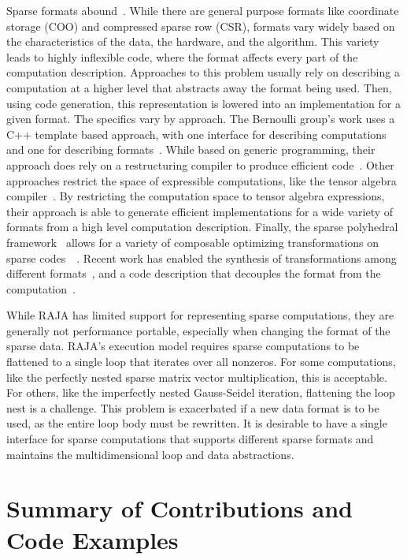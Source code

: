 Sparse formats abound~\cite{langr2015evaluation}. 
While there are general purpose formats like coordinate storage (COO) and compressed sparse row (CSR), formats vary widely based on the characteristics of the data, the hardware, and the algorithm.
This variety leads to highly inflexible code, where the format affects every part of the computation description.
Approaches to this problem usually rely on describing a computation at a higher level that abstracts away the format being used.
Then, using code generation, this representation is lowered into an implementation for a given format.
The specifics vary by approach.
The Bernoulli group's work uses a C++ template based approach, with one interface for describing computations~\cite{kotlyar1997relational} and one for describing formats~\cite{kotlyar1997compiling}.
While based on generic programming, their approach does rely on a restructuring compiler to produce efficient code~\cite{mateev2000bernoulli,ahmed2000framework}.
Other approaches restrict the space of expressible computations, like the tensor algebra compiler~\cite{kjolstad2017tensor}.
By restricting the computation space to tensor algebra expressions, their approach is able to generate efficient implementations for a wide variety of formats from a high level computation description.
Finally, the sparse polyhedral framework~\cite{strout2016approach} allows for a variety of composable optimizing transformations on sparse codes~~\cite{ahmad2017optimizing}.
Recent work has enabled the synthesis of transformations among different formats~\cite{popoola2023code}, and a code description that decouples the format from the computation~\cite{zhao2022polyhedral}.

While RAJA has limited support for representing sparse computations, they are generally not performance portable, especially when changing the format of the sparse data.
RAJA's execution model requires sparse computations to be flattened to a single loop that iterates over all nonzeros. 
For some computations, like the perfectly nested sparse matrix vector multiplication, this is acceptable.
For others, like the imperfectly nested Gauss-Seidel iteration, flattening the loop nest is a challenge.
This problem is exacerbated if a new data format is to be used, as the entire loop body must be rewritten.
It is desirable to have a single interface for sparse computations that supports different sparse formats and maintains the multidimensional loop and data abstractions.

\section{Summary of Contributions and Code Examples}

